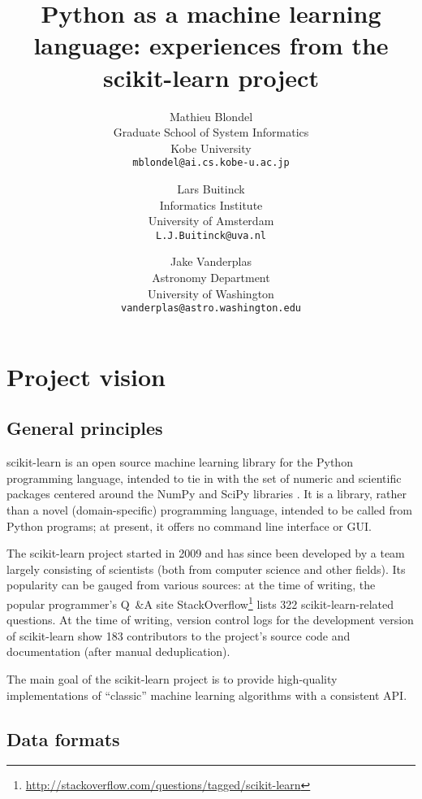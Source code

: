 \documentclass[a4paper]{article}
\title{Python as a machine learning language:
       experiences from the scikit-learn project}
\author{Mathieu Blondel \\
        Graduate School of System Informatics \\
        Kobe University \\
        \small{\texttt{mblondel@ai.cs.kobe-u.ac.jp}}
      \and
        Lars Buitinck \\
        Informatics Institute \\
        University of Amsterdam \\
        \small{\texttt{L.J.Buitinck@uva.nl}}
      \and
        Jake Vanderplas \\
        Astronomy Department \\
        University of Washington \\
        \small{\texttt{vanderplas@astro.washington.edu}}
}
\begin{document}
\maketitle

\section{Project vision}

\subsection{General principles}

scikit-learn \citep{pedregosa2011} is an open source machine learning library
for the Python programming language,
intended to tie in with the set of numeric and scientific packages
centered around the NumPy and SciPy libraries
.
It is a library, rather than a novel (domain-specific) programming language,
intended to be called from Python programs;
at present, it offers no command line interface or GUI.

The scikit-learn project started in 2009 and has since been developed
by a team largely consisting of scientists
(both from computer science and other fields).
Its popularity can be gauged from various sources:
at the time of writing,
the popular programmer's Q~\&{}A site StackOverflow\footnote{
  \url{http://stackoverflow.com/questions/tagged/scikit-learn}}
lists 322 scikit-learn-related questions.
At the time of writing,  %
version control logs for the development version of scikit-learn
show 183 contributors to the project's source code and documentation
(after manual deduplication).

The main goal of the scikit-learn project
is to provide high-quality implementations
of ``classic'' machine learning algorithms
with a consistent API.

\subsection{Data formats}
\end{document}
